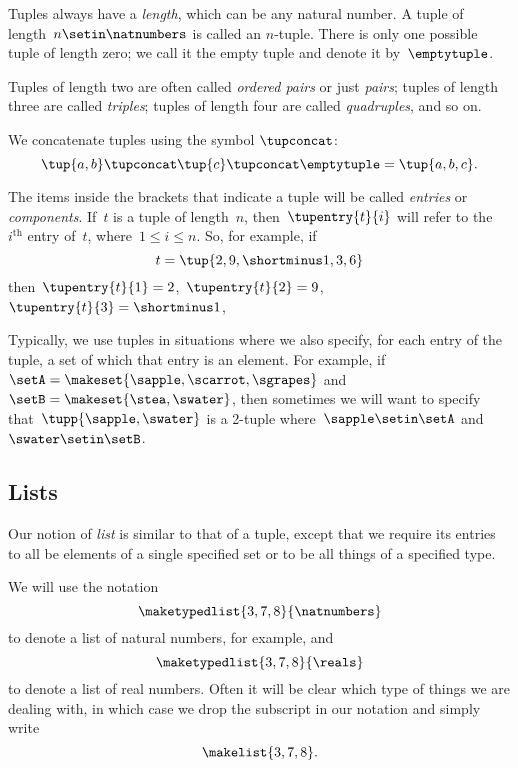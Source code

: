 Tuples always have a \emph{length}, which can be any natural number.
A tuple of length~$n \setin \natnumbers$ is called an $n$-tuple.
There is only one possible tuple of length zero; we call it the empty tuple and denote it by~$\emptytuple$.

Tuples of length two are often called \emph{ordered pairs} or just \emph{pairs};
tuples of length three are called \emph{triples};
tuples of length four are called \emph{quadruples}, and so on.

We concatenate tuples using the symbol $\tupconcat$:
\begin{equation}
    \tup{a,b} \tupconcat \tup{c} \tupconcat \emptytuple = \tup{a,b,c}.
\end{equation}

The items inside the brackets that indicate a tuple will be called \emph{entries} or \emph{components}.
If~$t$ is a tuple of length~$n$, then~$\tupentry{t}{i}$ will refer to the~$i^{\text{th}}$ entry of~$t$, where~$1 \leq i \leq n$.
So, for example, if
\begin{equation}
    t = \tup{2,9,\shortminus1, 3, 6}
\end{equation}
then~$\tupentry{t}{1} = 2$,~$\tupentry{t}{2} = 9$,~$\tupentry{t}{3} = \shortminus1$, \etc

Typically, we use tuples in situations where we also specify, for each entry of the tuple, a set of which that entry is an element.
For example, if~$\setA = \makeset{ \sapple, \scarrot, \sgrapes}$ and~$\setB = \makeset{ \stea, \swater }$, then sometimes we will want to specify that~$\tupp{\sapple, \swater}$ is a 2-tuple where~$\sapple \setin\setA$ and~$\swater \setin\setB$.


\subsection{Lists}
\label{sec:lists}

Our notion of \emph{list} is similar to that of a tuple, except that we require its entries to all be elements of a single specified set or to be all things of a specified type.

We will use the notation
\begin{equation}
    \maketypedlist{3, 7, 8}{\natnumbers}
\end{equation}
to denote a list of natural numbers, for example, and
\begin{equation}
    \maketypedlist{3, 7, 8}{\reals}
\end{equation}
to denote a list of real numbers.
Often it will be clear which type of things we are dealing with, in which case we drop the subscript in our notation and simply write
\begin{equation}
    \makelist{3, 7, 8}.
\end{equation}

